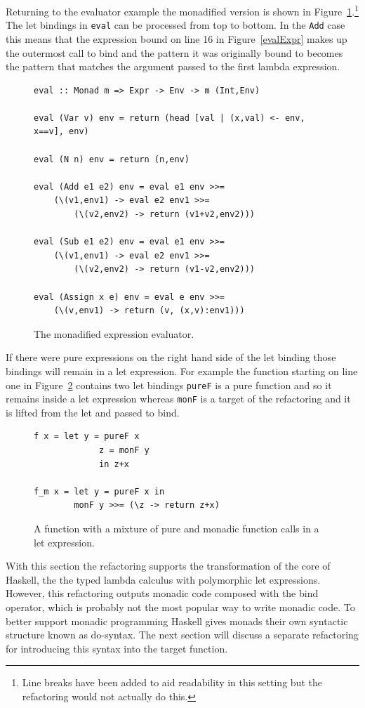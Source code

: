 Returning to the evaluator example the monadified version is shown in Figure~\ref{monEval}.\footnote{Line breaks have been added to aid readability in this setting but the refactoring would not actually do this.} The let bindings in \texttt{eval} can be processed from top to bottom. In the \texttt{Add} case this means that the expression bound on line 16 in Figure~\ref{evalExpr} makes up the outermost call to bind and the pattern it was originally bound to becomes the pattern that matches the argument passed to the first lambda expression. 
\begin{figure}[t]
\begin{lstlisting}
eval :: Monad m => Expr -> Env -> m (Int,Env)

eval (Var v) env = return (head [val | (x,val) <- env, x==v], env)

eval (N n) env = return (n,env)

eval (Add e1 e2) env = eval e1 env >>= 
	(\(v1,env1) -> eval e2 env1 >>= 
		(\(v2,env2) -> return (v1+v2,env2)))

eval (Sub e1 e2) env = eval e1 env >>= 
	(\(v1,env1) -> eval e2 env1 >>= 
		(\(v2,env2) -> return (v1-v2,env2)))

eval (Assign x e) env = eval e env >>= 
	(\(v,env1) -> return (v, (x,v):env1)))
\end{lstlisting}
\caption{The monadified expression evaluator.}
\label{monEval}
\end{figure}

If there were pure expressions on the right hand side of the let binding those bindings will remain in a let expression. For example the function starting on line one in Figure~\ref{mixLet} contains two let bindings \texttt{pureF} is a pure function and so it remains inside a let expression whereas \texttt{monF} is a target of the refactoring and it is lifted from the let and passed to bind. 

\begin{figure}[t]
\begin{lstlisting}
f x = let y = pureF x
             z = monF y
		     in z+x

f_m x = let y = pureF x in
		monF y >>= (\z -> return z+x)
\end{lstlisting}
\caption{A function with a mixture of pure and monadic function calls in a let expression.}
\label{mixLet}
\end{figure}

With this section the refactoring supports the transformation of the core of Haskell, the the typed lambda calculus with polymorphic let expressions. However, this refactoring outputs monadic code composed with the bind operator, which is probably not the most popular way to write monadic code. To better support monadic programming Haskell gives monads their own syntactic structure known as do-syntax. The next section will discuss a separate refactoring for introducing this syntax into the target function.

